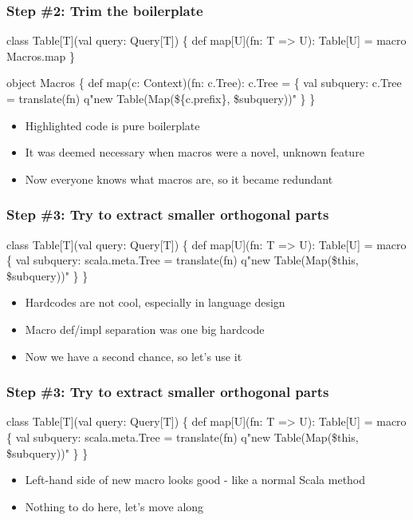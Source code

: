 \documentclass[svgnames,dvipsnames,hyperref={bookmarks=false},usepdftitle=false]{beamer}
\begin{document}
\begin{frame}[fragile]
\frametitle{Step \#2: Trim the boilerplate}
\begin{semiverbatim}
class Table[T](val query: Query[T]) \{
  def map[U](fn: T => U): Table[U] = macro \alert{Macros.map}
\alert{\}}

\alert{object Macros \{}
  \alert{def map(c: Context)(fn: c.Tree): c.Tree = }\{
    val subquery: c.Tree = translate(fn)
    q"new Table(Map(\$\{c.prefix\}, \$subquery))"
  \}
\}

\end{semiverbatim}
\begin{itemize}
\item Highlighted code is pure boilerplate
\item It was deemed necessary when macros were a novel, unknown feature
\item Now everyone knows what macros are, so it became redundant
\end{itemize}
\end{frame}

\begin{frame}[fragile]
\frametitle{Step \#3: Try to extract smaller orthogonal parts}
\begin{semiverbatim}
class Table[T](val query: Query[T]) \{
  def map[U](fn: T => U): Table[U] = macro \{
    val subquery: scala.meta.Tree = translate(fn)
    q"new Table(Map(\$this, \$subquery))"
  \}
\}

\end{semiverbatim}
\begin{itemize}
\item Hardcodes are not cool, especially in language design
\item Macro def/impl separation was one big hardcode
\item Now we have a second chance, so let's use it
\end{itemize}
\end{frame}

\begin{frame}[fragile]
\frametitle{Step \#3: Try to extract smaller orthogonal parts}
\begin{semiverbatim}
class Table[T](val query: Query[T]) \{
  \alert{def map[U](fn: T => U): Table[U]} = macro \{
    val subquery: scala.meta.Tree = translate(fn)
    q"new Table(Map(\$this, \$subquery))"
  \}
\}

\end{semiverbatim}
\begin{itemize}
\item Left-hand side of new macro looks good - like a normal Scala method
\item Nothing to do here, let's move along
\end{itemize}
\end{frame}
\end{document}
